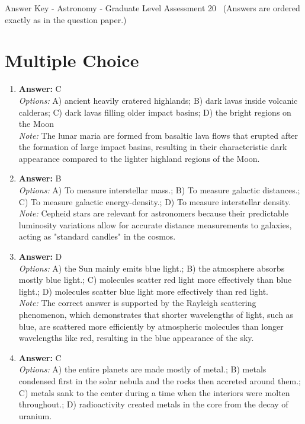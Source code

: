 \documentclass[12pt]{article}
\begin{document}
\begin{center}
Answer Key - Astronomy - Graduate Level Assessment 20 \
\small (Answers are ordered exactly as in the question paper.)
\end{center}

\section*{Multiple Choice}
\begin{enumerate}[label=\arabic*.]
\item \textbf{Answer:} C
\\ \textit{Options:} A) ancient heavily cratered highlands; B) dark lavas inside volcanic calderas; C) dark lavas filling older impact basins; D) the bright regions on the Moon
\\ \textit{Note:} The lunar maria are formed from basaltic lava flows that erupted after the formation of large impact basins, resulting in their characteristic dark appearance compared to the lighter highland regions of the Moon.
\item \textbf{Answer:} B
\\ \textit{Options:} A) To measure interstellar mass.; B) To measure galactic distances.; C) To measure galactic energy-density.; D) To measure interstellar density.
\\ \textit{Note:} Cepheid stars are relevant for astronomers because their predictable luminosity variations allow for accurate distance measurements to galaxies, acting as "standard candles" in the cosmos.
\item \textbf{Answer:} D
\\ \textit{Options:} A) the Sun mainly emits blue light.; B) the atmosphere absorbs mostly blue light.; C) molecules scatter red light more effectively than blue light.; D) molecules scatter blue light more effectively than red light.
\\ \textit{Note:} The correct answer is supported by the Rayleigh scattering phenomenon, which demonstrates that shorter wavelengths of light, such as blue, are scattered more efficiently by atmospheric molecules than longer wavelengths like red, resulting in the blue appearance of the sky.
\item \textbf{Answer:} C
\\ \textit{Options:} A) the entire planets are made mostly of metal.; B) metals condensed first in the solar nebula and the rocks then accreted around them.; C) metals sank to the center during a time when the interiors were molten throughout.; D) radioactivity created metals in the core from the decay of uranium.

\end{enumerate}
\end{document}
